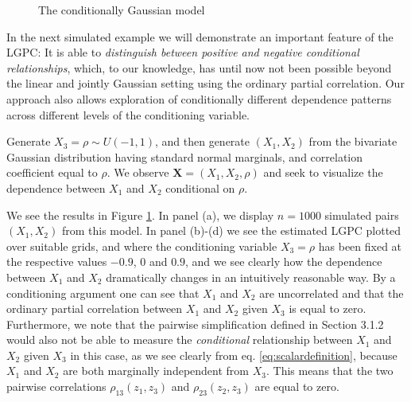 \documentclass[
  12pt,
  letterpaper]{article}
\newcommand{\X}{\bm{X}}
\theoremstyle{definition}
\theoremstyle{definition}
\theoremstyle{definition}
\theoremstyle{remark}
\begin{document}
\begin{figure}[p]
    \caption{The conditionally Gaussian model}\label{fig:simex2-plots}
\end{figure}

In the next simulated example we will demonstrate an important feature of the LGPC: It is able to \emph{distinguish between positive and negative conditional relationships}, which, to our knowledge, has until now not been possible beyond the linear and jointly Gaussian setting using the ordinary partial correlation. Our approach also allows exploration of conditionally different dependence patterns across different levels of the conditioning variable.

Generate \(X_3 = \rho \sim U(-1,1)\), and then generate \((X_1, X_2)\) from the bivariate Gaussian distribution having standard normal marginals, and correlation coefficient equal to \(\rho\). We observe \(\X = (X_1, X_2, \rho)\) and seek to visualize the dependence between \(X_1\) and \(X_2\) conditional on \(\rho\).

We see the results in Figure \ref{fig:simex2-plots}. In panel (a), we display \(n=1000\) simulated pairs \((X_1, X_2)\) from this model. In panel (b)-(d) we see the estimated LGPC plotted over suitable grids, and where the conditioning variable \(X_3 = \rho\) has been fixed at the respective values \(-0.9\), \(0\) and \(0.9\), and we see clearly how the dependence between \(X_1\) and \(X_2\) dramatically changes in an intuitively reasonable way. By a conditioning argument one can see that \(X_1\) and \(X_2\) are uncorrelated and that the ordinary partial correlation between \(X_1\) and \(X_2\) given \(X_3\) is equal to zero. Furthermore, we note that the pairwise simplification defined in Section 3.1.2 would also not be able to measure the \emph{conditional} relationship between \(X_1\) and \(X_2\) given \(X_3\) in this case, as we see clearly from eq. \eqref{eq:scalardefinition}, because \(X_1\) and \(X_2\) are both marginally independent from \(X_3\). This means that the two pairwise correlations \(\rho_{13}(z_1,z_3)\) and \(\rho_{23}(z_2,z_3)\) are equal to zero.
\end{document}
